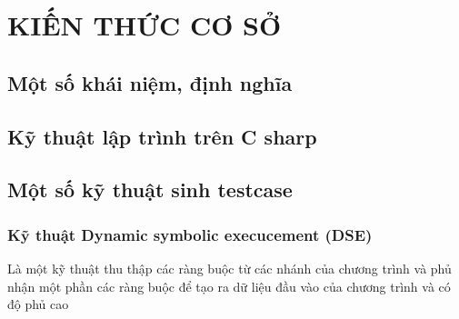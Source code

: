 \newpage
\chapter{KIẾN THỨC CƠ SỞ}

\section{Một số khái niệm, định nghĩa}
\section{Kỹ thuật lập trình trên C sharp}

\section{Một số kỹ thuật sinh testcase}

\subsection{Kỹ thuật Dynamic symbolic execucement (DSE) }

Là một kỹ thuật thu thập các ràng buộc từ các nhánh của chương trình
và phủ nhận một phần các ràng buộc để tạo ra dữ liệu đầu vào của
chương trình và có độ phủ cao

	

